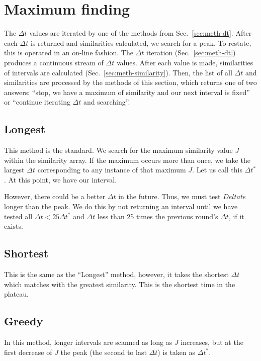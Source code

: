 \documentclass[draft]{article}
\begin{document}
\section{Maximum finding}
\label{sec:meth-peak}
The $\Delta t$ values are iterated by one of the methods from
Sec.~\ref{sec:meth-dt}.  After each $\Delta t$ is returned and
similarities calculated, we search for a peak.  To restate, this is
operated in an on-line fashion.  The $\Delta t$ iteration
(Sec.~\ref{sec:meth-dt}) produces a continuous stream of $\Delta t$
values.  After each value is made, similarities of intervals are
calculated (Sec.~\ref{sec:meth-similarity}).  Then, the list of all
$\Delta t$ and similarities are processed by the methods of this
section, which returns one of two answers: ``stop, we have a maximum
of similarity and our next interval is fixed'' or ``continue iterating
$\Delta t$ and searching''.

\subsection{Longest}

This method is the standard.  We search for the maximum similarity
value $J$ within the similarity array.  If the maximum occurs more
than once, we take the largest $\Delta t$ corresponding to any
instance of that maximum $J$.  Let us call this $\Delta t^*$.  At this
point, we have our interval.

However, there could be a better $\Delta t$ in the future.  Thus, we
must test $Delta t$s longer than the peak.  We do this by not
returning an interval until we have tested all $\Delta t <
25\Delta t^*$ and $\Delta t$ less than 25 times the previous round's
$\Delta t$, if it exists.

\subsection{Shortest}

This is the same as the ``Longest'' method, however, it takes the
shortest $\Delta t$ which matches with the greatest similarity.  This
is the shortest time in the plateau.

\subsection{Greedy}

In this method, longer intervals are scanned as long as $J$ increases,
but at the first decrease of $J$ the peak (the second to last $\Delta
t$) is taken as $\Delta t^*$.
\end{document}
